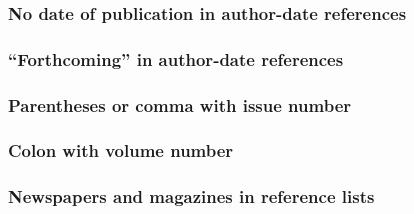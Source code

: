 \documentclass[11pt,letterpaper,oneside]{article}
\begin{document}
\setcounter{subsubsection}{43}
\subsubsection{No date of publication in author-date references}

\begin{citeref}
\item \parencite{nano1750}
\item \parencite{nano}
\end{citeref}

\subsubsection{``Forthcoming'' in author-date references}

\begin{citeref}
\item \parencite{faraday}
\end{citeref}

\setcounter{subsubsection}{46}
\subsubsection{Parentheses or comma with issue number}

\begin{citeref}
\item \parencite{glass2014}
\item \parencite{meyerovitch1959}
\end{citeref}

\subsubsection{Colon with volume number}

\begin{citeref}
\item \parencite{gunderson2015}
\end{citeref}

\subsubsection{Newspapers and magazines in reference lists}

\begin{citeref}
\item \parencite{nytimes2002}
\end{citeref}
\end{document}

